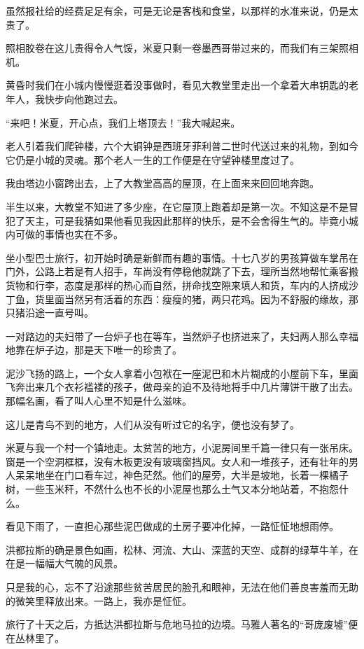 \par 虽然报社给的经费足足有余，可是无论是客栈和食堂，以那样的水准来说，仍是太贵了。
\par 照相胶卷在这儿贵得令人气馁，米夏只剩一卷墨西哥带过来的，而我们有三架照相机。
\par 黄昏时我们在小城内慢慢逛着没事做时，看见大教堂里走出一个拿着大串钥匙的老年人，我快步向他跑过去。
\par “来吧！米夏，开心点，我们上塔顶去！”我大喊起来。
\par 老人引着我们爬钟楼，六个大铜钟是西班牙菲利普二世时代送过来的礼物，到如今它仍是小城的灵魂。那个老人一生的工作便是在守望钟楼里度过了。
\par 我由塔边小窗跨出去，上了大教堂高高的屋顶，在上面来来回回地奔跑。
\par 半生以来，大教堂不知进了多少座，在它屋顶上跑着却是第一次。不知这是不是冒犯了天主，可是我猜如果他看见我因此那样的快乐，是不会舍得生气的。毕竟小城内可做的事情也实在不多。
\par 坐小型巴士旅行，初开始时确是新鲜而有趣的事情。十七八岁的男孩算做车掌吊在门外，公路上若是有人招手，车尚没有停稳他就跳了下去，理所当然地帮忙乘客搬货物和行李，态度是那样的热心而自然，拼命找空隙来填人和货，车内的人挤成沙丁鱼，货里面当然另有活着的东西：瘦瘦的猪，两只花鸡。因为不舒服的缘故，那只猪沿途一直号叫。
\par 一对路边的夫妇带了一台炉子也在等车，当然炉子也挤进来了，夫妇两人那么幸福地靠在炉子边，那是天下唯一的珍贵了。
\par 泥沙飞扬的路上，一个女人拿着小包袱在一座泥巴和木片糊成的小屋前下车，里面飞奔出来几个衣衫褴褛的孩子，做母亲的迫不及待地将手中几片薄饼干散了出去。那幅名画，看了叫人心里不知是什么滋味。
\par 这儿是青鸟不到的地方，人们从没有听过它的名字，便也没有梦了。
\par 米夏与我一个村一个镇地走。太贫苦的地方，小泥房间里千篇一律只有一张吊床。窗是一个空洞框框，没有木板更没有玻璃窗挡风。女人和一堆孩子，还有壮年的男人呆呆地坐在门口看车过，神色茫然。他们的屋旁，大半是坡地，长着一棵橘子树，一些玉米秆，不然什么也不长的小泥屋也那么土气又本分地站着，不抱怨什么。
\par 看见下雨了，一直担心那些泥巴做成的土房子要冲化掉，一路怔怔地想雨停。
\par 洪都拉斯的确是景色如画，松林、河流、大山、深蓝的天空、成群的绿草牛羊，在在是一幅幅大气魄的风景。
\par 只是我的心，忘不了沿途那些贫苦居民的脸孔和眼神，无法在他们善良害羞而无助的微笑里释放出来。一路上，我亦是怔怔。
\par 旅行了十天之后，方抵达洪都拉斯与危地马拉的边境。马雅人著名的“哥庞废墟”便在丛林里了。
